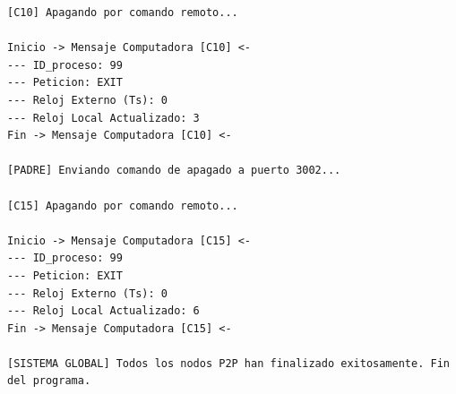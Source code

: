 \begin{lstlisting}[style=estiloC]
[C10] Apagando por comando remoto...

Inicio -> Mensaje Computadora [C10] <-
--- ID_proceso: 99
--- Peticion: EXIT
--- Reloj Externo (Ts): 0
--- Reloj Local Actualizado: 3
Fin -> Mensaje Computadora [C10] <-

[PADRE] Enviando comando de apagado a puerto 3002...

[C15] Apagando por comando remoto...

Inicio -> Mensaje Computadora [C15] <-
--- ID_proceso: 99
--- Peticion: EXIT
--- Reloj Externo (Ts): 0
--- Reloj Local Actualizado: 6
Fin -> Mensaje Computadora [C15] <-

[SISTEMA GLOBAL] Todos los nodos P2P han finalizado exitosamente. Fin del programa.
\end{lstlisting}